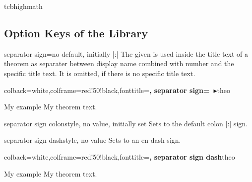 \begin{docCommand}{tcbhighmath}{}
\end{docCommand}


\clearpage
\subsection{Option Keys of the Library}


\begin{docTcbKey}{separator sign}{=}{no default, initially |:|}
  The given  is used inside the title text of a theorem
  as separater between display name combined with number and
  the specific title text. It is omitted, if there is no specific title text.

\begin{dispExample}
%
  {colback=white,colframe=red!50!black,fonttitle=\bfseries,
   separator sign={\ $\blacktriangleright$}}{theo}
\begin{sometheorem}{My example}{}
My theorem text.
\end{sometheorem}
\end{dispExample}
\end{docTcbKey}

\begin{docTcbKey}{separator sign colon}{}{style, no value, initially set}
Sets  to the default colon |:| sign.
\end{docTcbKey}

\begin{docTcbKey}{separator sign dash}{}{style, no value}
Sets  to an en-dash sign.
\begin{dispExample}
%
  {colback=white,colframe=red!50!black,fonttitle=\bfseries,
   separator sign dash}{theo}
\begin{sometheorem}{My example}{}
My theorem text.
\end{sometheorem}
\end{dispExample}
\end{docTcbKey}

